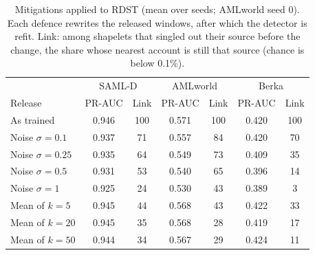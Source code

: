 \begin{table}[H]
\caption{Mitigations applied to RDST (mean over seeds; AMLworld seed 0). Each defence rewrites the released windows, after which the detector is refit. Link: among shapelets that singled out their source before the change, the share whose nearest account is still that source (chance is below 0.1\%).}
\label{tab:rdstdef}
\small\setlength{\tabcolsep}{2.5pt}
\centering
\begin{tabular}{lcccccc}
\toprule
& \multicolumn{2}{c}{SAML-D} & \multicolumn{2}{c}{AMLworld} & \multicolumn{2}{c}{Berka} \\
Release & PR-AUC & Link & PR-AUC & Link & PR-AUC & Link \\
\midrule
As trained & 0.946 & 100 & 0.571 & 100 & 0.420 & 100 \\
Noise $\sigma{=}0.1$ & 0.937 & 71 & 0.557 & 84 & 0.420 & 70 \\
Noise $\sigma{=}0.25$ & 0.935 & 64 & 0.549 & 73 & 0.409 & 35 \\
Noise $\sigma{=}0.5$ & 0.931 & 53 & 0.540 & 65 & 0.396 & 14 \\
Noise $\sigma{=}1$ & 0.925 & 24 & 0.530 & 43 & 0.389 & 3 \\
Mean of $k{=}5$ & 0.945 & 44 & 0.568 & 43 & 0.422 & 33 \\
Mean of $k{=}20$ & 0.945 & 35 & 0.568 & 28 & 0.419 & 17 \\
Mean of $k{=}50$ & 0.944 & 34 & 0.567 & 29 & 0.424 & 11 \\
\bottomrule\end{tabular}\end{table}
